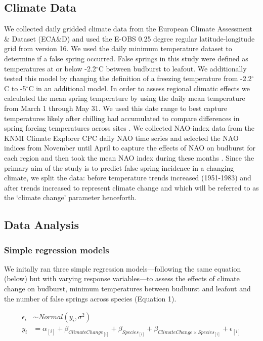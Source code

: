 \documentclass{article}\usepackage[]{graphicx}\usepackage[]{color}
\begin{document}
\subsection*{Climate Data}
We collected daily gridded climate data from the European Climate Assessment \& Dataset (ECA\&D) and used the E-OBS 0.25 degree regular latitude-longitude grid from version 16. We used the daily minimum temperature dataset to determine if a false spring occurred. False springs in this study were defined as temperatures at or below -2.2$^{\circ}$C \citep{Schwartz1993} between budburst to leafout. We additionally tested this model by changing the definition of a freezing temperature from -2.2$^{\circ}$C \citep{Schwartz1993} to -5$^{\circ}$C \citep{Lenz2013, Sakai1987} in an additional model. In order to assess regional climatic effects we calculated the mean spring temperature by using the daily mean temperature from March 1 through May 31. We used this date range to best capture temperatures likely after chilling had accumulated to compare differences in spring forcing temperatures across sites \citep{Basler2012, Korner2016}. We collected NAO-index data from the KNMI Climate Explorer CPC daily NAO time series and selected the NAO indices from November until April to capture the effects of NAO on budburst for each region and then took the mean NAO index during these months \citep{NAOdata}. Since the primary aim of the study is to predict false spring incidence in a changing climate, we split the data: before temperature trends increased (1951-1983) and after trends increased \citep[1984-2016,][]{Stocker2013,Kharouba2018} to represent climate change and which will be referred to as the `climate change' parameter henceforth.

\subsection*{Data Analysis} 
\subsubsection*{Simple regression models}
We initally ran three simple regression models---following the same equation (below) but with varying response variables---to assess the effects of climate change on budburst, minimum temperatures between budburst and leafout and the number of false springs across species (Equation 1).

\begin{align*}
\epsilon_i & \sim Normal(y_i ,  \sigma^{2}) \tag{1}\\
y_i &= \alpha_{[i]} + \beta_{ClimateChange_{[i]}} + \beta_{Species_{[i]}} + \beta_{ClimateChange \times Species_{[i]}} + \epsilon_{[i]} \nonumber\\
\end{align*}
\end{document}
